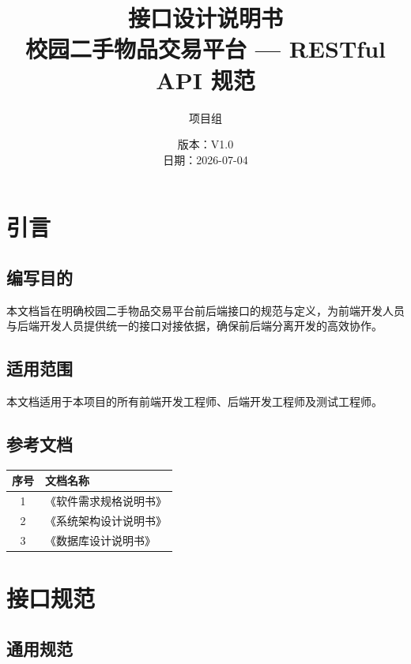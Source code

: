 \documentclass[12pt,a4paper,UTF8]{ctexart}
\title{\textbf{\Huge 接口设计说明书}\\[8pt]
       \normalsize 校园二手物品交易平台 --- RESTful API 规范}
\author{项目组}
\date{版本：V1.0\\[4pt] 日期：2026-07-04}
\begin{document}
\maketitle
\thispagestyle{empty}
\newpage

\tableofcontents
\newpage

\section{引言}

\subsection{编写目的}

本文档旨在明确校园二手物品交易平台前后端接口的规范与定义，为前端开发人员与后端开发人员提供统一的接口对接依据，确保前后端分离开发的高效协作。

\subsection{适用范围}

本文档适用于本项目的所有前端开发工程师、后端开发工程师及测试工程师。

\subsection{参考文档}

\begin{table}[H]
    \centering
    \begin{tabularx}{\textwidth}{|c|X|}
        \hline
        \textbf{序号} & \textbf{文档名称} \\
        \hline
        1 & 《软件需求规格说明书》 \\
        \hline
        2 & 《系统架构设计说明书》 \\
        \hline
        3 & 《数据库设计说明书》 \\
        \hline
    \end{tabularx}
\end{table}

\section{接口规范}

\subsection{通用规范}
\end{document}
